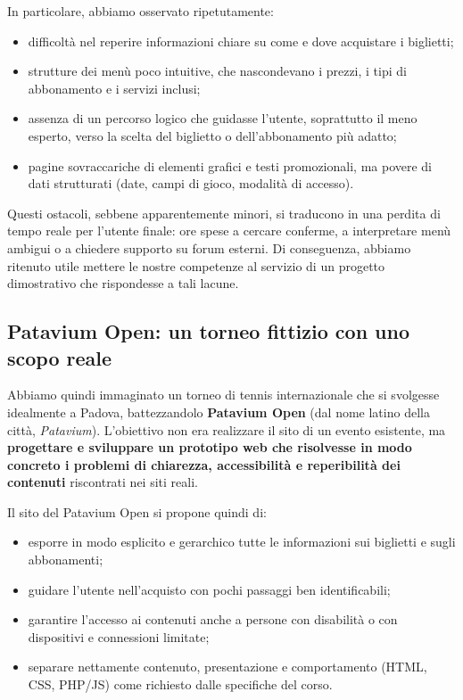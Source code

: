 \documentclass[11pt,a4paper]{article}
\begin{document}
In particolare, abbiamo osservato ripetutamente:
\begin{itemize}
    \item difficoltà nel reperire informazioni chiare su come e dove acquistare i biglietti;
    \item strutture dei menù poco intuitive, che nascondevano i prezzi, i tipi di abbonamento e i servizi inclusi;
    \item assenza di un percorso logico che guidasse l'utente, soprattutto il meno esperto, verso la scelta del biglietto o dell'abbonamento più adatto;
    \item pagine sovraccariche di elementi grafici e testi promozionali, ma povere di dati strutturati (date, campi di gioco, modalità di accesso).
\end{itemize}

Questi ostacoli, sebbene apparentemente minori, si traducono in una perdita di tempo reale per l’utente finale: ore spese a cercare conferme, a interpretare menù ambigui o a chiedere supporto su forum esterni. Di conseguenza, abbiamo ritenuto utile mettere le nostre competenze al servizio di un progetto dimostrativo che rispondesse a tali lacune.

\subsection{Patavium Open: un torneo fittizio con uno scopo reale}
Abbiamo quindi immaginato un torneo di tennis internazionale che si svolgesse idealmente a Padova, battezzandolo \textbf{Patavium Open} (dal nome latino della città, \textit{Patavium}). L'obiettivo non era realizzare il sito di un evento esistente, ma \textbf{progettare e sviluppare un prototipo web che risolvesse in modo concreto i problemi di chiarezza, accessibilità e reperibilità dei contenuti} riscontrati nei siti reali.

Il sito del Patavium Open si propone quindi di:
\begin{itemize}
    \item esporre in modo esplicito e gerarchico tutte le informazioni sui biglietti e sugli abbonamenti;
    \item guidare l'utente nell’acquisto con pochi passaggi ben identificabili;
    \item garantire l’accesso ai contenuti anche a persone con disabilità o con dispositivi e connessioni limitate;
    \item separare nettamente contenuto, presentazione e comportamento (HTML, CSS, PHP/JS) come richiesto dalle specifiche del corso.
\end{itemize}
\end{document}
